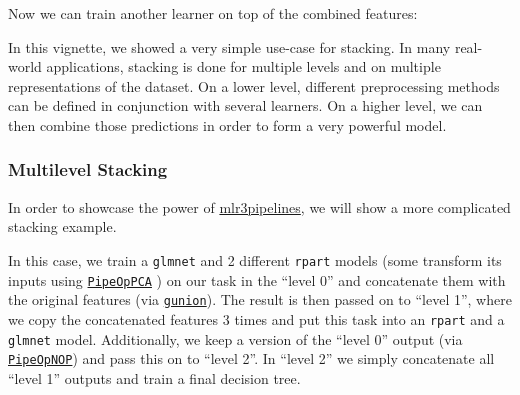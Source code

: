 \documentclass[]{scrbook}
\newenvironment{Shaded}{\begin{snugshade}}{\end{snugshade}}
\newcommand{\DataTypeTok}[1]{\textcolor[rgb]{0.13,0.29,0.53}{#1}}
\newcommand{\KeywordTok}[1]{\textcolor[rgb]{0.13,0.29,0.53}{\textbf{#1}}}
\newcommand{\NormalTok}[1]{#1}
\newcommand{\OperatorTok}[1]{\textcolor[rgb]{0.81,0.36,0.00}{\textbf{#1}}}
\newcommand{\OtherTok}[1]{\textcolor[rgb]{0.56,0.35,0.01}{#1}}
\newcommand{\StringTok}[1]{\textcolor[rgb]{0.31,0.60,0.02}{#1}}
\renewenvironment{Shaded} {\begin{snugshade}\small} {\end{snugshade}}
\begin{document}
Now we can train another learner on top of the combined features:

\begin{Shaded}
\end{Shaded}

\begin{Shaded}
\end{Shaded}

In this vignette, we showed a very simple use-case for stacking.
In many real-world applications, stacking is done for multiple levels and on multiple representations of the dataset.
On a lower level, different preprocessing methods can be defined in conjunction with several learners.
On a higher level, we can then combine those predictions in order to form a very powerful model.

\hypertarget{multilevel-stacking}{%
\subsubsection{Multilevel Stacking}\label{multilevel-stacking}}

In order to showcase the power of \href{https://mlr3pipelines.mlr-org.com}{mlr3pipelines}, we will show a more complicated stacking example.

In this case, we train a \texttt{glmnet} and 2 different \texttt{rpart} models (some transform its inputs using \href{https://mlr3pipelines.mlr-org.com/reference/mlr_pipeops_pca.html}{\texttt{PipeOpPCA}} ) on our task in the ``level 0'' and concatenate them with the original features (via \href{https://mlr3pipelines.mlr-org.com/reference/gunion.html}{\texttt{gunion}}).
The result is then passed on to ``level 1'', where we copy the concatenated features 3 times and put this task into an \texttt{rpart} and a \texttt{glmnet} model.
Additionally, we keep a version of the ``level 0'' output (via \href{https://mlr3pipelines.mlr-org.com/reference/mlr_pipeops_nop.html}{\texttt{PipeOpNOP}}) and pass this on to ``level 2''.
In ``level 2'' we simply concatenate all ``level 1'' outputs and train a final decision tree.
\end{document}
